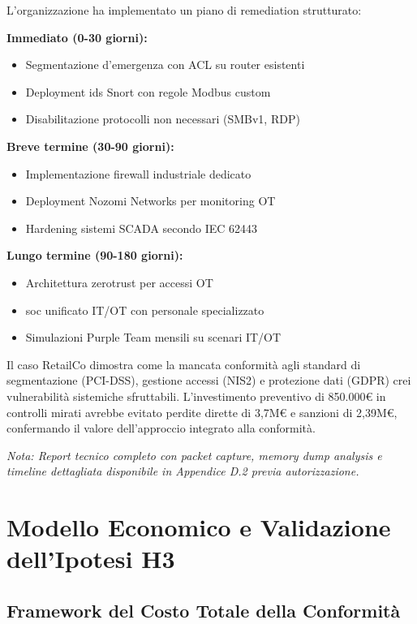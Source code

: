 L'organizzazione ha implementato un piano di remediation strutturato:

\textbf{Immediato (0-30 giorni):}
\begin{itemize}
    \item Segmentazione d'emergenza con ACL su router esistenti
    \item Deployment \gls{ids} Snort con regole Modbus custom
    \item Disabilitazione protocolli non necessari (SMBv1, RDP)
\end{itemize}

\textbf{Breve termine (30-90 giorni):}
\begin{itemize}
    \item Implementazione firewall industriale dedicato
    \item Deployment Nozomi Networks per monitoring OT
    \item Hardening sistemi SCADA secondo IEC 62443
\end{itemize}

\textbf{Lungo termine (90-180 giorni):}
\begin{itemize}
    \item Architettura \gls{zerotrust} per accessi OT
    \item \gls{soc} unificato IT/OT con personale specializzato
    \item Simulazioni Purple Team mensili su scenari IT/OT
\end{itemize}

Il caso RetailCo dimostra come la mancata conformità agli standard di segmentazione (PCI-DSS), gestione accessi (NIS2) e protezione dati (GDPR) crei vulnerabilità sistemiche sfruttabili. L'investimento preventivo di 850.000€ in controlli mirati avrebbe evitato perdite dirette di 3,7M€ e sanzioni di 2,39M€, confermando il valore dell'approccio integrato alla conformità.

\textit{Nota: Report tecnico completo con packet capture, memory dump analysis e timeline dettagliata disponibile in Appendice D.2 previa autorizzazione.}

\section{\texorpdfstring{Modello Economico e Validazione dell'Ipotesi H3}{4.6 - Modello Economico e Validazione dell'Ipotesi H3}}

\subsection{\texorpdfstring{Framework del Costo Totale della Conformità}{4.6.1 - Framework del Costo Totale della Conformità}}

